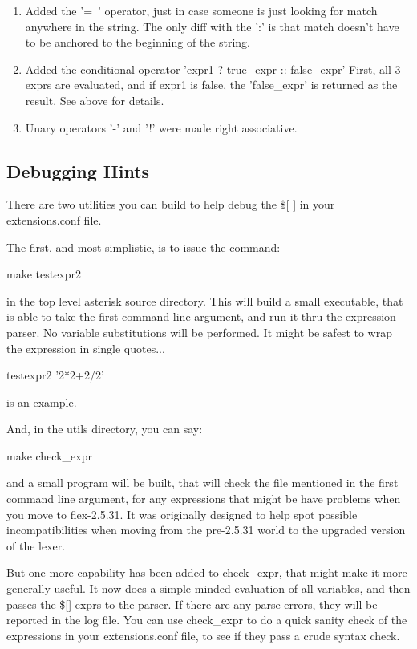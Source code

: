 \begin{enumerate}
\item  Added the '=~' operator, just in case someone is just looking for
    match anywhere in the string. The only diff with the ':' is that
    match doesn't have to be anchored to the beginning of the string.

\item  Added the conditional operator  'expr1 ? true\_expr :: false\_expr'
    First, all 3 exprs are evaluated, and if expr1 is false, the 'false\_expr'
    is returned as the result. See above for details. 

\item  Unary operators '-' and '!' were made right associative.
\end{enumerate}

\subsection{Debugging Hints}

There are two utilities you can build to help debug the \$[ ] in
your extensions.conf file.

The first, and most simplistic, is to issue the command:

make testexpr2

in the top level asterisk source directory. This will build a small
executable, that is able to take the first command line argument, and
run it thru the expression parser. No variable substitutions will be
performed. It might be safest to wrap the expression in single
quotes...

testexpr2 '2*2+2/2'

is an example.

And, in the utils directory, you can say:

make check\_expr

and a small program will be built, that will check the file mentioned
in the first command line argument, for any expressions that might be
have problems when you move to flex-2.5.31.  It was originally
designed to help spot possible incompatibilities when moving from the
pre-2.5.31 world to the upgraded version of the lexer.

But one more capability has been added to check\_expr, that might make
it more generally useful. It now does a simple minded evaluation of
all variables, and then passes the \$[] exprs to the parser. If there
are any parse errors, they will be reported in the log file. You can
use check\_expr to do a quick sanity check of the expressions in your
extensions.conf file, to see if they pass a crude syntax check.

